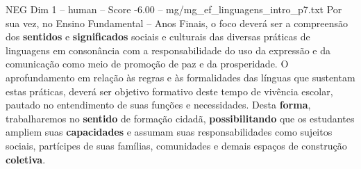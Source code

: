 \begin{textsample}{NEG Dim 1 – human – Score -6.00 – mg/mg\_ef\_linguagens\_intro\_p7.txt}  \label{ex:f1_neg_017}
Por sua vez, no Ensino Fundamental – Anos Finais, o foco deverá ser a compreensão dos \textbf{sentidos} e \textbf{significados} sociais e culturais das diversas práticas de linguagens em consonância com a responsabilidade do uso da expressão e da comunicação como meio de promoção de paz e da prosperidade.
O aprofundamento em relação às regras e às formalidades das línguas que sustentam estas práticas, deverá ser objetivo formativo deste tempo de vivência escolar, pautado no entendimento de suas funções e necessidades.
Desta \textbf{forma}, trabalharemos no \textbf{sentido} de formação cidadã, \textbf{possibilitando} que os estudantes ampliem suas \textbf{capacidades} e assumam suas responsabilidades como sujeitos sociais, partícipes de suas famílias, comunidades e demais espaços de construção \textbf{coletiva}.

\end{textsample}

